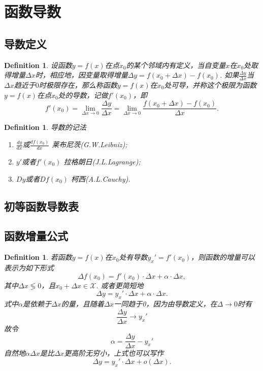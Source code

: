 \documentclass{article}
\newtheorem{definition}[theorem]{Definition}
\begin{document}
\newpage
\section{函数导数}

\subsection{导数定义}

\begin{definition}
\rm 设函数$y=f(x)$在点$x_0$的某个邻域内有定义，当自变量$x$在$x_0$处取得增量$\Delta x$时，相应地，因变量取得增量$\Delta y = f(x_0 + \Delta x) - f(x_0)$. 如果$\frac{\Delta y}{\Delta x}$当$\Delta x$趋近于$0$时极限存在，那么称函数$y = f(x)$在$x_0$处可导，并称这个极限为函数$y=f(x)$在点$x_0$处的导数，记做$f'(x_0)$，即
$$
f'(x_0) = \lim\limits_{\Delta x \rightarrow 0} \frac{\Delta y}{\Delta x} = \lim\limits_{\Delta x \rightarrow 0} \frac{f(x_0 + \Delta x) - f(x_0)}{\Delta x}.
$$
\end{definition}

\begin{definition}
\rm {\color{red} 导数的记法}
\begin{enumerate}
	\item $\frac{dy}{dx}$或$\frac{df(x_0)}{dx}$ 莱布尼茨(G.W.Leibniz);
	\item $y'$或者$f'(x_0)$ 拉格朗日(J.L.Lagrange);
	\item $Dy$或者$Df(x_0)$ 柯西(A.L.Cauchy).
\end{enumerate}
\end{definition}

\subsection{初等函数导数表}


\subsection{函数增量公式}

\begin{definition}
\rm 若函数$y=f(x)$在$x_0$处有导数$y_x'=f'(x_0)$，则函数的增量可以表示为如下形式
$$
\Delta f(x_0) = f'(x_0) \cdot \Delta x + \alpha \cdot \Delta x,
$$
其中$\Delta x \lessgtr 0$，且$x_0 + \Delta x \in \mathcal{X}$. 或者更简短地
$$
\Delta y = y_x'\cdot \Delta x + \alpha \cdot \Delta x.
$$
式中$\alpha$是依赖于$\Delta x$的量，且随着$\Delta x$一同趋于0，因为由导数定义，在$\Delta \rightarrow 0$时有
$$
\frac{\Delta y}{\Delta x} \rightarrow y_x'
$$
故令
$$
\alpha =  \frac{\Delta y}{\Delta x} - y_x'
$$
自然地$\alpha \Delta x$是比$\Delta x$更高阶无穷小，上式也可以写作
$$
\Delta y = y_x' \cdot \Delta x + o(\Delta x).
$$
\end{definition}
\end{document}
